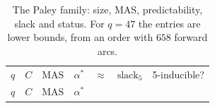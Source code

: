 \documentclass[
]{article}
\begin{document}
\begin{longtable}[]{@{}
  >{\raggedright\arraybackslash}p{}
  >{\raggedright\arraybackslash}p{}
  >{\raggedright\arraybackslash}p{}
  >{\raggedright\arraybackslash}p{}
  >{\raggedright\arraybackslash}p{}
  >{\raggedright\arraybackslash}p{}
  >{\raggedright\arraybackslash}p{}@{}}
\caption{The Paley family: size, MAS, predictability, slack and status.
For \(q = 47\) the entries are lower bounds, from an order with \(658\)
forward arcs.}\tabularnewline*
\toprule\noalign{}
\begin{minipage}[b]{\linewidth}\raggedright
\(q\)
\end{minipage} & \begin{minipage}[b]{\linewidth}\raggedright
\(C\)
\end{minipage} & \begin{minipage}[b]{\linewidth}\raggedright
\(\mathrm{MAS}\)
\end{minipage} & \begin{minipage}[b]{\linewidth}\raggedright
\(\alpha^{*}\)
\end{minipage} & \begin{minipage}[b]{\linewidth}\raggedright
\(\approx\)
\end{minipage} & \begin{minipage}[b]{\linewidth}\raggedright
\(\mathrm{slack}_5\)
\end{minipage} & \begin{minipage}[b]{\linewidth}\raggedright
5-inducible?
\end{minipage} \\*
\midrule\noalign{}
\endfirsthead
\toprule\noalign{}
\begin{minipage}[b]{\linewidth}\raggedright
\(q\)
\end{minipage} & \begin{minipage}[b]{\linewidth}\raggedright
\(C\)
\end{minipage} & \begin{minipage}[b]{\linewidth}\raggedright
\(\mathrm{MAS}\)
\end{minipage} & \begin{minipage}[b]{\linewidth}\raggedright
\(\alpha^{*}\)
\end{minipage} & \begin{minipage}[b]{\linewidth}\raggedright

\end{minipage}
\end{longtable}
\end{document}
